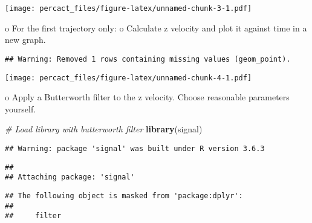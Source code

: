 \documentclass[
]{article}
\newenvironment{Shaded}{\begin{snugshade}}{\end{snugshade}}
\newcommand{\CommentTok}[1]{\textcolor[rgb]{0.56,0.35,0.01}{\textit{#1}}}
\newcommand{\DataTypeTok}[1]{\textcolor[rgb]{0.13,0.29,0.53}{#1}}
\newcommand{\KeywordTok}[1]{\textcolor[rgb]{0.13,0.29,0.53}{\textbf{#1}}}
\newcommand{\NormalTok}[1]{#1}
\newcommand{\OperatorTok}[1]{\textcolor[rgb]{0.81,0.36,0.00}{\textbf{#1}}}
\newcommand{\StringTok}[1]{\textcolor[rgb]{0.31,0.60,0.02}{#1}}
\begin{document}
\texttt{[image: percact\_files/figure-latex/unnamed-chunk-3-1.pdf]}

o For the first trajectory only: o Calculate z velocity and plot it
against time in a new graph.

\begin{Shaded}
\end{Shaded}

\begin{verbatim}
## Warning: Removed 1 rows containing missing values (geom_point).
\end{verbatim}

\texttt{[image: percact\_files/figure-latex/unnamed-chunk-4-1.pdf]}

o Apply a Butterworth filter to the z velocity. Choose reasonable
parameters yourself.

\begin{Shaded}
\begin{Highlighting}[]
\CommentTok{# Load library with butterworth filter}
\KeywordTok{library}\NormalTok{(signal)}
\end{Highlighting}
\end{Shaded}

\begin{verbatim}
## Warning: package 'signal' was built under R version 3.6.3
\end{verbatim}

\begin{verbatim}
## 
## Attaching package: 'signal'
\end{verbatim}

\begin{verbatim}
## The following object is masked from 'package:dplyr':
## 
##     filter
\end{verbatim}
\end{document}

